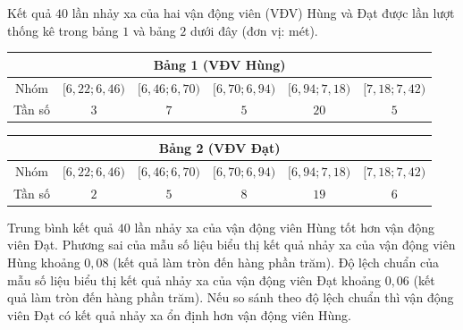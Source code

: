 \begin{ex}
Kết quả $40$ lần nhảy xa của hai vận động viên (VĐV) Hùng và Đạt được lần lượt thống kê trong bảng $1$ và bảng $2$ dưới đây (đơn vị: mét).
\begin{center}
\begin{tabular}{|c|c|c|c|c|c|}\hline
\multicolumn{6}{|c|}{Bảng 1 (VĐV Hùng)}\\\hline
Nhóm & $[6{,}22;6{,}46)$ & $[6{,}46;6{,}70)$ & $[6{,}70;6{,}94)$ & $[6{,}94;7{,}18)$ & $[7{,}18;7{,}42)$\\\hline
Tần số & $3$ & $7$ & $5$ & $20$ & $5$\\\hline
\end{tabular}
\vskip 4pt
\begin{tabular}{|c|c|c|c|c|c|}\hline
\multicolumn{6}{|c|}{Bảng 2 (VĐV Đạt)}\\\hline
Nhóm & $[6{,}22;6{,}46)$ & $[6{,}46;6{,}70)$ & $[6{,}70;6{,}94)$ & $[6{,}94;7{,}18)$ & $[7{,}18;7{,}42)$\\\hline
Tần số & $2$ & $5$ & $8$ & $19$ & $6$\\\hline
\end{tabular}
\end{center}
\choiceTF
{Trung bình kết quả $40$ lần nhảy xa của vận động viên Hùng tốt hơn vận động viên Đạt.}
{Phương sai của mẫu số liệu biểu thị kết quả nhảy xa của vận động viên Hùng khoảng $0{,}08$ (kết quả làm tròn đến hàng phần trăm).}
{Độ lệch chuẩn của mẫu số liệu biểu thị kết quả nhảy xa của vận động viên Đạt khoảng $0{,}06$ (kết quả làm tròn đến hàng phần trăm).}
{\True Nếu so sánh theo độ lệch chuẩn thì vận động viên Đạt có kết quả nhảy xa ổn định hơn vận động viên Hùng.}
\end{ex}
